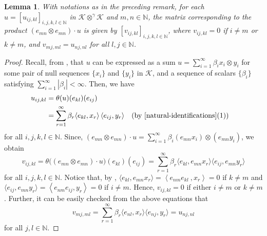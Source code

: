 \documentclass[a4]{amsart}
\theoremstyle{cupthm}
\newtheorem{lemma}[thm]{Lemma}
\theoremstyle{cupdefn}
\theoremstyle{cuprem}
\numberwithin{equation}{section}
\newcommand{\obp}{\otimes^{\gamma}}
\newcommand{\N}{\mathbb N}
\def\la{\langle}
\def\ra{\rangle}
\begin{document}
\begin{lemma}\label{left-product}
With notations as in the preceding remark, for each $u=[u_{ij,
    kl}]_{i,j,k,l\in \mathbb N}$ in $\mathcal K\obp\mathcal K$ and
$m, n \in \N$, the matrix corresponding to the product $(
e_{mn}\otimes e_{mn})\cdot u$ is given by $[v_{ij, kl}]_{i,j,k,l\in
  \mathbb N}$, where $v_{ij, kl}=0$ if $i\neq m$ or $k\neq m$, and
$v_{mj, ml}=u_{nj, nl}$ for all $l,j\in \N$.
\end{lemma}

\begin{proof}
	Recall, from \cite[$\S 2.1$]{Ryan}, that $u$ can be expressed
        as a sum $u=\sum_{i=1}^\infty \beta_i x_i\otimes
        y_i$ for some pair of null sequences $\{x_i\}$ and
        $\{y_i\}$ in  $\mathcal K$,
        and a sequence of scalars $\{\beta_i\}$ satisfying
        $\sum_{i=1}^\infty|\beta_i|<\infty$. Then, we have
        \begin{align*}
          u_{ij,kl}&=\theta(u)(e_{kl})(e_{ij})\\&=\sum_{r=1}^\infty\beta_r
           \la e_{kl}, x_r\ra \left<e_{ij},y_r\right>&&
          (\text{by  \Cref{natural-identifications}}(1))
	\end{align*}
        for all $i, j, k, l \in \N$.  Since, $(
        e_{mn}\otimes e_{mn})\cdot u=\sum_{i=1}^\infty \beta_i (e_{mn} x_i)\otimes (e_{mn}y_i)$, we obtain
        \[
        v_{ij,kl} = \theta\big(( e_{mn}\otimes e_{mn})\cdot
        u\big) (e_{kl})( e_{ij})=
        \sum_{r=1}^\infty \beta_r \la e_{kl}, e_{mn}
          x_r\ra\la  e_{ij},e_{mn} y_r\ra
          \]
                  for all $i, j, k, l \in \N$.  Notice that, by
                  , $\la e_{kl}, e_{mn} x_r\ra=
                  \left<e_{nm} e_{kl}~, x_r\right> = 0$ if $k\neq m$
                  and $\la  e_{ij},e_{mn} y_r\ra = \left< e_{nm}
                  e_{ij},y_r \right> = 0$ if $i\neq m$.  Hence,
                  $v_{ij,kl}=0$ if either $i\neq m$ or $k\neq
                  m$. Further, it can be easily checked from the above
                  equations that
        \[
        v_{mj, ml}=\sum_{r=1}^\infty\beta_r
        \la e_{nl}, x_r\ra \la  e_{nj},y_r\ra = u_{nj, nl}
        \]
        for all $j, l \in \N$.
\end{proof}
\end{document}
